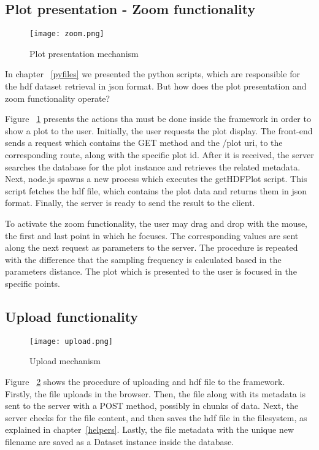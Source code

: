\subsection{Plot presentation - Zoom functionality}
\begin{figure}
	\texttt{[image: zoom.png]}
	\caption{Plot presentation mechanism}
	\label{zoom}
\end{figure}
In chapter ~\ref{pyfiles} we presented the python scripts, which are responsible for the hdf dataset retrieval in json format. But how does the plot presentation and zoom functionality operate?\par 
	Figure ~\ref{zoom} presents the actions tha must be done inside the framework in order to show a plot to the user. Initially, the user requests the plot display. The front-end sends a request which contains the GET method and the /plot uri, to the corresponding route, along with the specific plot id. After it is received, the server searches the database for the plot instance and retrieves the related metadata. Next, node.js spawns a new process which executes the getHDFPlot script. This script fetches the hdf file, which contains the plot data and returns them in json format. Finally, the server is ready to send the result to the client. \par 
	To activate the zoom functionality, the user may drag and drop with the mouse, the first and last point in which he focuses. The corresponding values are sent along the next request as parameters to the server. The procedure is repeated with the difference that the sampling frequency is calculated based in the parameters distance. The plot which is presented to the user is focused in the specific points.	
	
\subsection{Upload functionality}
\begin{figure}
	\texttt{[image: upload.png]}
	\caption{Upload mechanism}
	\label{upload}
\end{figure}
Figure ~\ref{upload} shows the procedure of uploading and hdf file to the framework. Firstly, the file uploads in the browser. Then, the file along with its metadata is sent to the server with a POST method, possibly in chunks of data.  Next, the server checks for the file content, and then saves the hdf file in the filesystem, as explained in chapter~\ref{helpers}. Lastly, the file metadata with the unique new filename are saved as a Dataset instance inside the database.

